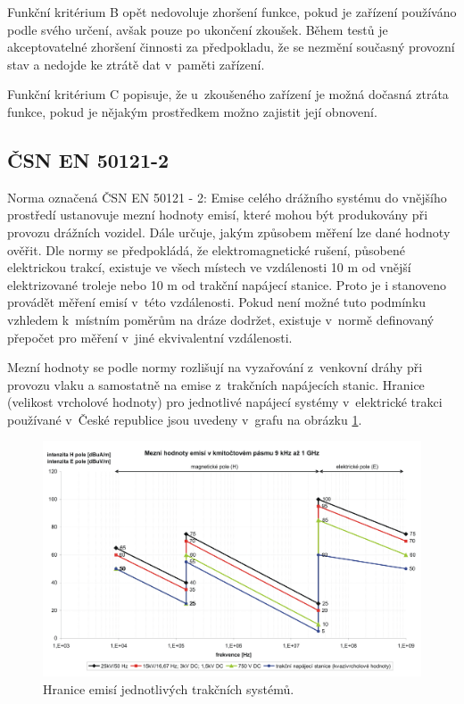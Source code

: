 Funkční kritérium B opět nedovoluje zhoršení funkce, pokud je zařízení používáno podle svého určení, avšak pouze po ukončení zkoušek. Během testů je akceptovatelné zhoršení činnosti za předpokladu, že se nezmění současný provozní stav a nedojde ke ztrátě dat v~paměti zařízení.

Funkční kritérium C popisuje, že u~zkoušeného zařízení je možná dočasná ztráta funkce, pokud je nějakým prostředkem možno zajistit její obnovení.

\subsection{ČSN EN 50121-2}
Norma označená ČSN EN 50121 - 2: Emise celého drážního  systému do vnějšího prostředí ustanovuje mezní hodnoty emisí, které mohou být produkovány při provozu drážních vozidel. Dále určuje, jakým způsobem měření lze dané hodnoty ověřit. Dle normy se předpokládá, že elektromagnetické rušení, působené elektrickou trakcí, existuje ve všech místech ve vzdálenosti 10 m od vnější elektrizované troleje nebo 10 m od trakční napájecí stanice. Proto je i stanoveno provádět měření emisí v~této vzdálenosti. Pokud není možné tuto podmínku vzhledem k~místním poměrům na dráze dodržet, existuje v~normě definovaný přepočet pro měření v~jiné ekvivalentní vzdálenosti. 

Mezní hodnoty se podle normy rozlišují na vyzařování z~venkovní dráhy při provozu vlaku a samostatně na emise z~trakčních napájecích stanic. Hranice (velikost vrcholové hodnoty) pro jednotlivé napájecí systémy v~elektrické trakci používané v~České republice jsou uvedeny v~grafu na obrázku \ref{obr:emc_emise}.

\begin{figure}[!h]
	\centering
	\includegraphics[width=12cm]{emc_emise2.png}
	\caption{Hranice emisí jednotlivých trakčních systémů.}
	\label{obr:emc_emise}
\end{figure}

